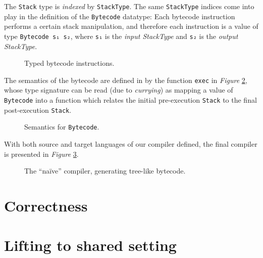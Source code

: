 \documentclass[a4paper]{article}
\newcommand{\fref}[1]{\emph{Figure} \ref{lst:#1}}
\begin{document}
        The \texttt{Stack} type is \emph{indexed} by \texttt{StackType}.
        The same \texttt{StackType} indices come into play in the definition of the \texttt{Bytecode} datatype:
        Each bytecode instruction performs a certain stack manipulation,
        and therefore each instruction is a value of type \texttt{Bytecode s₁ s₂},
        where \texttt{s₁} is the \emph{input StackType} and \texttt{s₂} is the \emph{output StackType}.

        \begin{figure}[h!]
            \caption{Typed bytecode instructions.
                \label{lst:bytecode}
            }
        \end{figure}

        The semantics of the bytecode are defined in by the function \texttt{exec} in \fref{exec}, whose type 
        signature can be read (due to \emph{currying}) as mapping a value of \texttt{Bytecode}
        into a function which relates the initial pre-execution \texttt{Stack} to the final post-execution \texttt{Stack}.

        \begin{figure}[h!]
            \caption{Semantics for \texttt{Bytecode}.
                \label{lst:exec}
            }
        \end{figure}

        With both source and target languages of our compiler defined, the final compiler is presented in \fref{compile}.

        \begin{figure}[h!]
            \caption{The ``naïve'' compiler, generating tree-like bytecode.
                \label{lst:compile}
            }
        \end{figure}

    \section{Correctness}
    \label{sec:basic}
        
        


    \section{Lifting to shared setting}
    \label{sec:lifting}
\end{document}
